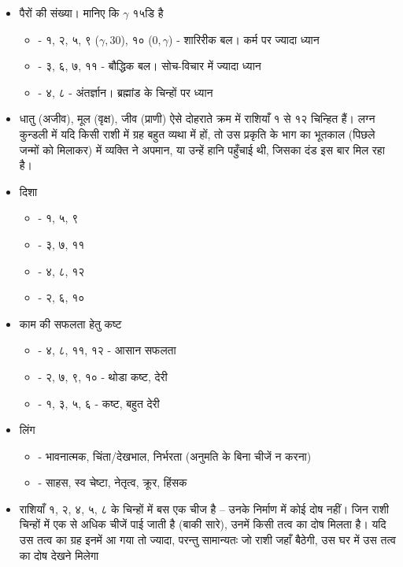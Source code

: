 \begin{itemize}
\begin{itemize}
        \item {} - ३, ४, ९, १०
        \item {} - १, २, ११, १२
    \end{itemize}
    \item पैरों की संख्या। मानिए कि $\gamma$  १५डि है \begin{itemize}
        \item {} - १, २, ५, ९ ($\gamma, 30$), १० ($0,\gamma$) - शारिरीक बल। कर्म पर ज्यादा ध्यान
        \item {} - ३, ६, ७, ११ - बौद्धिक बल। सोच-विचार में ज्यादा ध्यान
        \item {} - ४, ८ - अंतर्ज्ञान। ब्रह्मांड के चिन्हों पर ध्यान
    \end{itemize}
    \item धातु (अजीव), मूल (वृक्ष), जीव (प्राणी) ऐसे दोहराते क्रम में राशियाँ १ से १२ चिन्हित हैं। लग्न कुन्डली में यदि किसी राशी में ग्रह बहुत व्यथा में हों, तो उस प्रकृति के भाग का भूतकाल (पिछले जन्मों को मिलाकर) में व्यक्ति ने अपमान, या उन्हें हानि पहुँचाई थी, जिसका दंड इस बार मिल रहा है।
    \item दिशा \begin{itemize}
        \item {} - १, ५, ९
        \item {} - ३, ७, ११
        \item {} - ४, ८, १२
        \item {} - २, ६, १०
    \end{itemize}
    \item काम की सफलता हेतु कष्ट \begin{itemize}
        \item {} - ४, ८, ११, १२ - आसान सफलता
        \item {} - २, ७, ९, १० - थोडा कष्ट, देरी
        \item {} - १, ३, ५, ६ - कष्ट, बहुत देरी
    \end{itemize}
    \item लिंग \begin{itemize}
        \item {} - भावनात्मक, चिंता/देखभाल, निर्भरता (अनुमति के बिना चीजें न करना)
        \item {} - साहस, स्व चेष्टा, नेतृत्व, क्रूर, हिंसक
    \end{itemize}
    \item राशियाँ १, २, ४, ५, ८ के चिन्हों में बस एक चीज है -- उनके निर्माण में कोई दोष नहीं। जिन राशी चिन्हों में एक से अधिक चीजें पाई जाती है (बाकी सारे), उनमें किसी तत्व का दोष मिलता है। यदि उस तत्व का ग्रह इनमें आ गया तो ज्यादा, परन्तु सामान्यतः जो राशी जहाँ बैठेगी, उस घर में उस तत्व का दोष देखने मिलेगा \begin{itemize}

\end{itemize}
\end{itemize}
